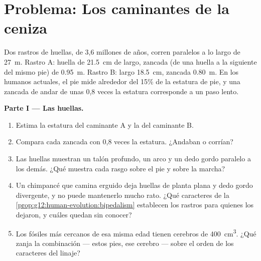 \section{Problema: Los caminantes de la ceniza}

\begin{problem}
\label{pb:g12:human-evolution:1}
Dos rastros de huellas, de 3,6 millones de años, corren paralelos a lo
largo de \qty{27}{m}. Rastro A: huella de \qty{21.5}{cm} de largo,
zancada (de una huella a la siguiente del mismo pie) de \qty{0.95}{m}.
Rastro B: largo \qty{18.5}{cm}, zancada \qty{0.80}{m}. En los humanos
actuales, el pie mide alrededor del 15\% de la estatura de pie, y una
zancada de andar de unas 0,8 veces la estatura corresponde a un paso
lento.

\medskip
\noindent\textbf{Parte I --- Las huellas.}
\begin{enumerate}
  \item Estima la estatura del caminante A y la del caminante B.
  \item Compara cada zancada con 0,8 veces la estatura. ¿Andaban o
        corrían?
  \item Las huellas muestran un talón profundo, un arco y un dedo gordo
        paralelo a los demás. ¿Qué muestra cada rasgo sobre el pie y
        sobre la marcha?
  \item Un chimpancé que camina erguido deja huellas de planta plana y
        dedo gordo divergente, y no puede mantenerlo mucho rato. ¿Qué
        caracteres de la
        \cref{prop:g12:human-evolution:bipedalism} establecen los
        rastros para quienes los dejaron, y cuáles quedan sin conocer?
  \item Los fósiles más cercanos de esa misma edad tienen cerebros de
        \qty{400}{cm^3}. ¿Qué zanja la combinación --- estos pies, ese
        cerebro --- sobre el orden de los caracteres del linaje?
\end{enumerate}


\end{problem}
